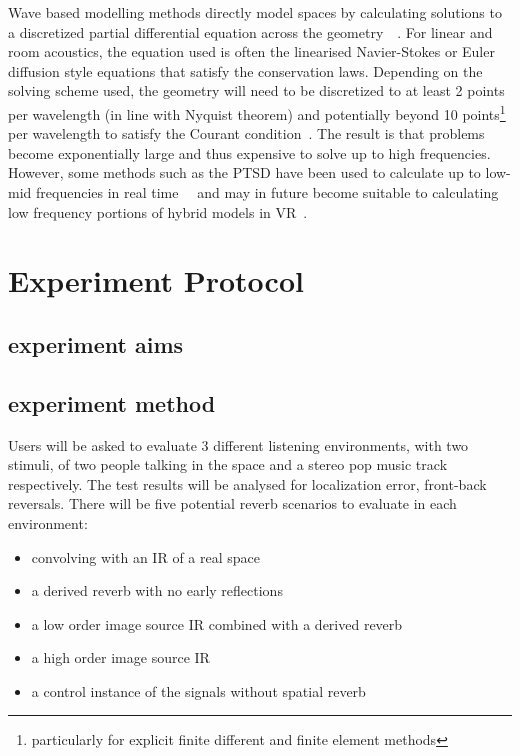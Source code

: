 \documentclass{svproc}
\begin{document}
Wave based modelling methods directly model spaces by calculating solutions to a discretized partial differential equation across the geometry~\cite{Botteldooren1995}~\cite{Bilbao2013}. For linear and room acoustics, the equation used is often the linearised Navier-Stokes or Euler diffusion style equations that satisfy the conservation laws. Depending on the solving scheme used, the geometry will need to be discretized to at least 2 points per wavelength (in line with Nyquist theorem) and potentially beyond 10 points\footnote{particularly for explicit finite different and finite element methods} per wavelength to satisfy the Courant condition~\cite{Siltanen2013}. The result is that problems become exponentially large and thus expensive to solve up to high frequencies. However, some methods such as the PTSD have been used to calculate up to low-mid frequencies in real time~\cite{Angus2010}~\cite{Savioja2010} and may in future become suitable to calculating low frequency portions of hybrid models in VR~\cite{Southern2012}.

\newpage
\section{Experiment Protocol}
\subsection{experiment aims}


\subsection{experiment method}
Users will be asked to evaluate 3 different listening environments, with two stimuli, of two people talking in the space and a stereo pop music track respectively. The test results will be analysed for localization error, front-back reversals. There will be five potential reverb scenarios to evaluate in each environment: 
\begin{itemize}
\item convolving with an IR of a real space
\item a derived reverb with no early reflections 
\item a low order image source IR combined with a derived reverb
\item a high order image source IR
\item a control instance of the signals without spatial reverb
\end{itemize}
\end{document}
